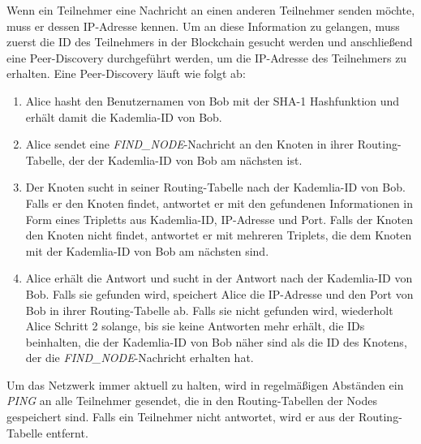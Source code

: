 Wenn ein Teilnehmer eine Nachricht an einen anderen Teilnehmer senden möchte, muss er dessen IP-Adresse kennen. Um an diese Information zu gelangen, muss zuerst die ID des Teilnehmers in der Blockchain gesucht werden und anschließend eine Peer-Discovery durchgeführt werden, um die IP-Adresse des Teilnehmers zu erhalten. Eine Peer-Discovery läuft wie folgt ab:

\begin{enumerate}
    \item Alice hasht den Benutzernamen von Bob mit der SHA-1 Hashfunktion und erhält damit die Kademlia-ID von Bob.
    \item Alice sendet eine \textit{FIND\_NODE}-Nachricht an den Knoten in ihrer Routing-Tabelle, der der Kademlia-ID von Bob am nächsten ist. 
    \item Der Knoten sucht in seiner Routing-Tabelle nach der Kademlia-ID von Bob. Falls er den Knoten findet, antwortet er mit den gefundenen Informationen in Form eines Tripletts aus Kademlia-ID, IP-Adresse und Port. Falls der Knoten den Knoten nicht findet, antwortet er mit mehreren Triplets, die dem Knoten mit der Kademlia-ID von Bob am nächsten sind.
    \item Alice erhält die Antwort und sucht in der Antwort nach der Kademlia-ID von Bob. Falls sie gefunden wird, speichert Alice die IP-Adresse und den Port von Bob in ihrer Routing-Tabelle ab. Falls sie nicht gefunden wird, wiederholt Alice Schritt 2 solange, bis sie keine Antworten mehr erhält, die IDs beinhalten, die der Kademlia-ID von Bob näher sind als die ID des Knotens, der die \textit{FIND\_NODE}-Nachricht erhalten hat.
\end{enumerate}


\noindent Um das Netzwerk immer aktuell zu halten, wird in regelmäßigen Abständen ein \textit{PING} an alle Teilnehmer gesendet, die in den Routing-Tabellen der Nodes gespeichert sind. Falls ein Teilnehmer nicht antwortet, wird er aus der Routing-Tabelle entfernt.
